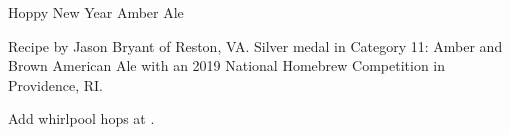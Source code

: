 \stylesection{\styleamericanamberale}

\begin{recipe}{Hoppy New Year Amber Ale} %

\begin{aboutblock}
Recipe by Jason Bryant of Reston, VA. Silver medal in Category 11: Amber and
Brown American Ale with an 2019 National Homebrew Competition in Providence,
RI. \sourceaha
\end{aboutblock}


\begin{methodandtiming}
 
\begin{mashsteps}
\end{mashsteps}

\begin{fermentationsteps}
\end{fermentationsteps}

\begin{directions}
Add whirlpool hops at .
\end{directions}

\end{methodandtiming}

\recipebreak

\begin{ingredientsblock}

\begin{malts}
\end{malts}

\begin{hops}
\end{hops}


\end{ingredientsblock}

\end{recipe}

